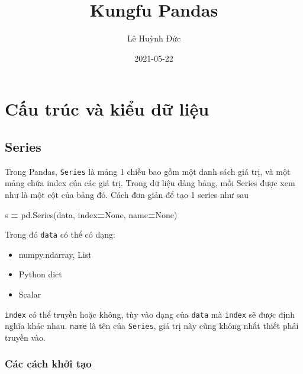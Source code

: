 \documentclass[
]{book}
\title{Kungfu Pandas}
\author{Lê Huỳnh Đức}
\date{2021-05-22}
\newenvironment{Shaded}{\begin{snugshade}}{\end{snugshade}}
\newcommand{\NormalTok}[1]{#1}
\newcommand{\OperatorTok}[1]{\textcolor[rgb]{0.81,0.36,0.00}{\textbf{#1}}}
\newcommand{\VariableTok}[1]{\textcolor[rgb]{0.00,0.00,0.00}{#1}}
\begin{document}
\maketitle

{
\setcounter{tocdepth}{1}
\tableofcontents
}
\hypertarget{cux1ea5u-truxfac-vuxe0-kiux1ec3u-dux1eef-liux1ec7u}{%
\chapter{Cấu trúc và kiểu dữ liệu}\label{cux1ea5u-truxfac-vuxe0-kiux1ec3u-dux1eef-liux1ec7u}}

\hypertarget{series}{%
\section{Series}\label{series}}

Trong Pandas, \texttt{Series} là mảng 1 chiều bao gồm một danh sách giá trị, và một mảng chứa index của các giá trị. Trong dữ liệu dảng bảng, mỗi Series được xem như là một cột của bảng đó. Cách đơn giản để tạo 1 series như sau

\begin{Shaded}
\begin{Highlighting}[]
\NormalTok{s }\OperatorTok{=}\NormalTok{ pd.Series(data, index}\OperatorTok{=}\VariableTok{None}\NormalTok{, name}\OperatorTok{=}\VariableTok{None}\NormalTok{)}
\end{Highlighting}
\end{Shaded}

Trong đó \texttt{data} có thể có dạng:

\begin{itemize}
\item
  numpy.ndarray, List
\item
  Python dict
\item
  Scalar
\end{itemize}

\texttt{index} có thể truyền hoặc không, tùy vào dạng của \texttt{data} mà \texttt{index} sẽ được định nghĩa khác nhau.
\texttt{name} là tên của \texttt{Series}, giá trị này cũng không nhất thiết phải truyền vào.

\hypertarget{cuxe1c-cuxe1ch-khux1edfi-tux1ea1o}{%
\subsection*{Các cách khởi tạo}\label{cuxe1c-cuxe1ch-khux1edfi-tux1ea1o}}
\end{document}
